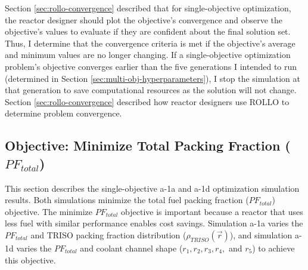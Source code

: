 Section \ref{sec:rollo-convergence} described that for single-objective optimization, 
the reactor designer should plot the objective's convergence and observe the 
objective's values to evaluate if they are confident about the final solution set.  
Thus, I determine that the convergence criteria is met if the objective's 
average and minimum values are no longer changing. 
If a single-objective optimization problem's objective converges earlier than the 
five generations I intended to run (determined in Section 
\ref{sec:multi-obj-hyperparameters}), I stop the simulation at that generation to 
save computational resources as the solution will not change. 
Section \ref{sec:rollo-convergence} described how reactor designers use 
\gls{ROLLO} to determine problem convergence. 

\subsection{Objective: Minimize Total Packing Fraction ($PF_{total}$)}
\label{sec:assem-1-obj-pf}
This section describes the single-objective a-1a and a-1d optimization simulation
results. 
Both simulations minimize the total fuel packing fraction ($PF_{total}$) objective. 
The minimize $PF_{total}$ objective is important because a reactor that uses less fuel
with similar performance enables cost savings. 
Simulation a-1a varies the $PF_{total}$ and \gls{TRISO} packing fraction distribution 
($\rho_{TRISO}(\vec{r})$), and simulation a-1d varies the $PF_{total}$ and coolant 
channel shape ($r_1, r_2, r_3, r_4,$ and $r_5$) to achieve this objective. 

